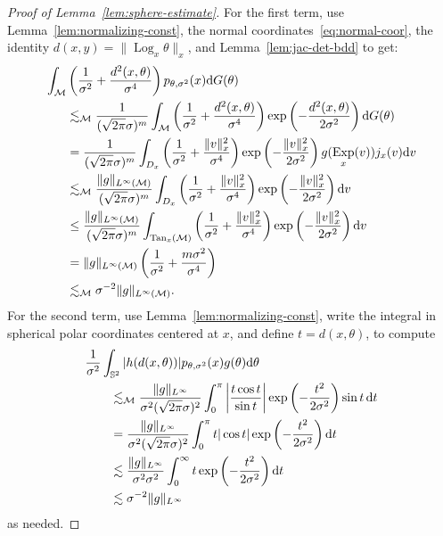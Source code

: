 \documentclass[preprint]{imsart}
\theoremstyle{plain}
\theoremstyle{definition}
\newcommand{\Mcal}{\mathcal{M}}
\newcommand{\diff}{\textnormal{d}}
\DeclareMathOperator{\Tan}{Tan}
\DeclareMathOperator{\Log}{Log}
\DeclareMathOperator{\Exp}{Exp}
\begin{document}
\begin{appendix}
\begin{proof}[Proof of Lemma~\ref{lem:sphere-estimate}]
    For the first term, use Lemma~\ref{lem:normalizing-const}, the normal coordinates~\eqref{eq:normal-coor}, the identity $d(x,y) = \|\Log_x\theta\|_x$, and Lemma~\ref{lem:jac-det-bdd} to get:
    \begin{align*}
        \int_{\Mcal}&\left(\frac{1}{\sigma^2} +\frac{d^2(x,\theta)}{\sigma^4}\right)p_{\theta,\sigma^2}(x)\diff G(\theta) \\
        &\lesssim_{\Mcal} \frac{1}{(\sqrt{2\pi}\sigma)^m}\int_{\Mcal}\left(\frac{1}{\sigma^2} +\frac{d^2(x,\theta)}{\sigma^4}\right)\exp\left(-\frac{d^2(x,\theta)}{2\sigma^2}\right)\diff G(\theta) \\
        &= \frac{1}{(\sqrt{2\pi}\sigma)^m}\int_{D_x}\left(\frac{1}{\sigma^2} +\frac{\|v\|_x^2}{\sigma^4}\right)\exp\left(-\frac{\|v\|_x^2}{2\sigma^2}\right)g(\Exp_x(v))j_x(v)\diff v \\
        &\lesssim_{\Mcal} \frac{\|g\|_{L^{\infty}(\Mcal)}}{(\sqrt{2\pi}\sigma)^m}\int_{D_x}\left(\frac{1}{\sigma^2} +\frac{\|v\|_x^2}{\sigma^4}\right)\exp\left(-\frac{\|v\|_x^2}{2\sigma^2}\right)\diff v \\
        &\le \frac{\|g\|_{L^{\infty}(\Mcal)}}{(\sqrt{2\pi}\sigma)^m}\int_{\Tan_x(\Mcal)}\left(\frac{1}{\sigma^2} +\frac{\|v\|_x^2}{\sigma^4}\right)\exp\left(-\frac{\|v\|_x^2}{2\sigma^2}\right)\diff v \\
        &= \|g\|_{L^{\infty}(\Mcal)}\left(\frac{1}{\sigma^2} +\frac{m\sigma^2}{\sigma^4}\right) \\
        &\lesssim_{\Mcal} \sigma^{-2}\|g\|_{L^{\infty}(\Mcal)}.
    \end{align*}
    For the second term, use Lemma~\ref{lem:normalizing-const}, write the integral in spherical polar coordinates centered at $x$, and define $t=d(x,\theta)$, to compute
    \begin{equation*}
        \begin{split}
        &\frac{1}{\sigma^2}
        \int_{\mathbb S^2}
        |h(d(x,\theta))|p_{\theta,\sigma^2}(x)g(\theta)\diff\theta \\
        &\qquad\lesssim_\Mcal
        \frac{\|g\|_{L^\infty}}{\sigma^2(\sqrt{2\pi}\sigma)^2}
        \int_0^\pi
        \left|\frac{t\cos t}{\sin t}\right|
        \exp\left(-\frac{t^2}{2\sigma^2}\right)
        \sin t\,\diff t \\
        &\qquad=
        \frac{\|g\|_{L^\infty}}{\sigma^2(\sqrt{2\pi}\sigma)^2}
        \int_0^\pi
        t|\cos t|
        \exp\left(-\frac{t^2}{2\sigma^2}\right)\diff t \\
        &\qquad\lesssim
        \frac{\|g\|_{L^\infty}}{\sigma^2\sigma^2}
        \int_0^\infty
        t\exp\left(-\frac{t^2}{2\sigma^2}\right)\diff t \\
        &\qquad\lesssim
        \sigma^{-2}\|g\|_{L^\infty}
        \end{split}
    \end{equation*}
    as needed.


\end{proof}
\end{appendix}
\end{document}
